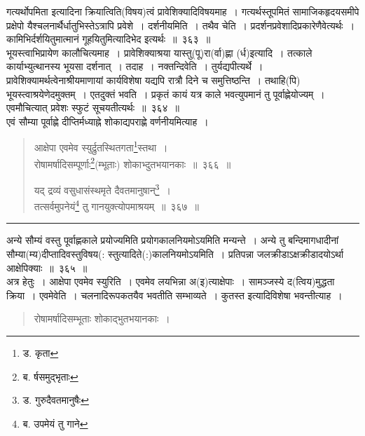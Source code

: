 \documentclass[11pt, openany]{book}
\begin{document}
{\qtt गत्यर्थोपमिता} इत्यादिना क्रियात्विति(विषय)त्वं प्रावेशिक्यादिविषयमाह~। {\qtt गत्यर्थस्तूपमितं} सामाजिकहृदयसमीपे प्रक्षेपो यैश्चलनार्थैर्धातुभिस्तेऽत्रापि प्रवेशे~। दर्शनीयमिति~। {\qtt तथैव चेति}~। प्रदर्शनप्रवेशादिप्रकारेणैवेत्यर्थः~। कामिभिर्दर्शयितुमात्मानं गूहयितुमित्यादिभेद इत्यर्थः~॥~३६३~॥\\

भूयस्त्वाभिप्रायेण कालौचित्यमाह~। {\qtt प्रावेशिक्याश्रया यास्तु(पू)रा(र्वा)ह्णा (र्ध)}इत्यादि~। तत्काले कार्याभ्युत्थानस्य भूयसा दर्शनात्~। तदाह~। नक्तन्दिवेति~। तुर्यद्यपीत्यर्थे~। प्रावेशिक्यामर्थत्वेनाश्रीयमाणायां कार्यविशेषा यद्यपि रात्रौ दिने च समुत्तिष्ठन्ति~। तथाहि(पि) भूयस्त्वाश्रयेणेदमुक्तम्~। एतदुक्तं भवति~। प्रकृतं कायं यत्र काले भवत्युपमानं तु पूर्वाह्णेयोज्यम्~। एवमौचित्यात् प्रवेशः स्फुटं सूचयतीत्यर्थः~॥~३६४~॥\\

एवं {\qtt सौम्या पूर्वाह्णे दीप्तिर्मध्याह्ने} शोकाद्यपराह्णे वर्णनीयमित्याह~।

\newpage

\begin{quote}
{\na आक्षेपा एवमेव स्युर्द्रुतस्थितगता\renewcommand{\thefootnote}{1}\footnote{ड. कृता}स्तथा~।\\
 रोषामर्षादिसम्पूर्णाः\renewcommand{\thefootnote}{2}\footnote{ब. र्षसमुद्भृताः}(म्भूताः) शोकाभ्दुतभयानकाः~॥~३६६~॥

 यद् द्रव्यं वसुधासंस्थमृते दैवतमानुषान्\renewcommand{\thefootnote}{3}\footnote{ड. गुरुदैवतमानुषैः}~।\\
 तत्सर्वमुपनेयं\renewcommand{\thefootnote}{4}\footnote{ब. उपमेयं तु गाने} तु गानयुक्त्योपमाश्रयम्~॥~३६७~॥}
\end{quote}

\hrule

\vspace{2mm}
\noindent
{\qtt अन्ये} सौम्यं वस्तु पूर्वाह्णकाले प्रयोज्यमिति प्रयोगकालनियमोऽयमिति मन्यन्ते~। अन्ये तु बन्दिमागधादीनां सौम्या(म्य)दीप्तादिवस्तुविषय(: स्तुत्यादिते(:)कालनियमोऽयमिति~। प्रतिपन्ना जलक्रीडाऽक्षक्रीडादयोऽर्था {\qtt आक्षेपिक्याः}~॥~३६५~॥\\

अत्र हेतुः~। {\qtt आक्षेपा एवमेव} स्युरिति~। एवमेव लयभिन्ना अ(इ)त्याक्षेपाः~। सामञ्जस्ये द(त्विय)मुद्धता क्रिया~। {\qtt एवमेवेति}~। चलनादिरूपकतयैव भवतीति सम्भाव्यते~। कुतस्त इत्यादिविशेषा भवन्तीत्याह~।

\begin{quote}
{\qt रोषामर्षादिसम्भूताः शोकाद्भुतभयानकाः~।}
\end{quote}
\end{document}

